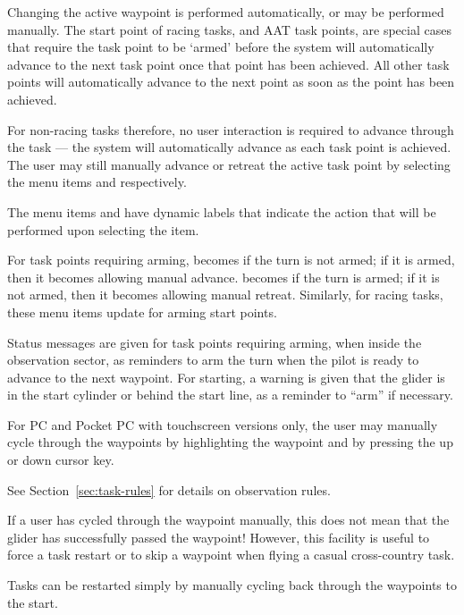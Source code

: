 Changing the active waypoint is performed automatically, or may be performed manually.
The start point of racing tasks, and AAT task points, are special cases that require
the task point to be `armed' before the system will automatically advance to the next
task point once that point has been achieved.  All other task points will automatically
advance to the next point as soon as the point has been achieved.

For non-racing tasks therefore, no user interaction is required to
advance through the task --- the system will automatically advance as
each task point is achieved.  The user may still manually advance or retreat the active
task point by selecting the menu items \blink{} and
\blink{} respectively.

The menu items \blink{} and
\blink{} have dynamic labels that
indicate the action that will be performed upon selecting the item.

For task points requiring arming, \blink{} becomes  if the turn is not armed; if it
is armed, then it becomes  allowing manual
advance.   \blink{} becomes  if the turn is armed; if it
is not armed, then it becomes  allowing manual
retreat.  Similarly, for racing tasks, these menu items update for arming
start points. 

Status messages are given for task points requiring arming, when
inside the observation sector, as reminders to arm the turn when the
pilot is ready to advance to the next waypoint. For starting, a
warning is given that the glider is in the start cylinder or behind
the start line, as a reminder to ``arm'' if necessary.

For PC and Pocket PC with touchscreen versions only, the user may
manually cycle through the waypoints by highlighting the waypoint
{\InfoBox} and by pressing the up or down cursor key.

See Section~\ref{sec:task-rules} for details on observation rules.

If a user has cycled through the waypoint manually, this does not mean
that the glider has successfully passed the waypoint!  However, this
facility is useful to force a task restart or to skip a waypoint when
flying a casual cross-country task.

\tip Tasks can be restarted simply by manually cycling back through the
waypoints to the start.

